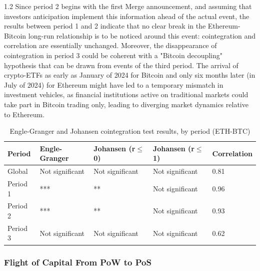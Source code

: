 \documentclass[10pt]{article}
\begin{document}
\begin{setstretch}{1.2}
Since period 2 begins with the first Merge announcement, and assuming that investors anticipation implement this information ahead of the actual event, the results between period 1 and 2 indicate that no clear break in the Ethereum-Bitcoin long-run relationship is to be noticed around this event: cointegration and correlation are essentially unchanged. Moreover, the disappearance of cointegration in period 3 could be coherent with a "Bitcoin decoupling" hypothesis that can be drawn from events of the third period. The arrival of crypto-ETFs as early as January of 2024 for Bitcoin and only six months later (in July of 2024) for Ethereum might have led to a temporary mismatch in investment vehicles, as financial institutions active on traditional markets could take part in Bitcoin trading only, leading to diverging market dynamics relative to Ethereum.

\begin{table}[!htbp]
\centering
\small
\caption{Engle-Granger and Johansen cointegration test results, by period (ETH-BTC)}
\vspace{4pt}
\label{tab:cointegration}
\renewcommand{\arraystretch}{1.3}
\begin{tabular}{lllll}
\textbf{Period}   & \textbf{Engle-Granger} & \textbf{Johansen (r$\le$0)}  & \textbf{Johansen (r$\le$1)}  & \textbf{Correlation} \\
\hline
Global  & Not significant                         & Not significant & Not significant & 0.81        \\
Period 1 & ***                                     & **               & Not significant & 0.96        \\
Period 2 & ***                                     & **               & Not significant & 0.93        \\
Period 3 & Not significant                         & Not significant & Not significant & 0.62  \\
\hline      
\end{tabular}
\end{table}


        \subsubsection{Flight of Capital From PoW to PoS}


\end{setstretch}
\end{document}
